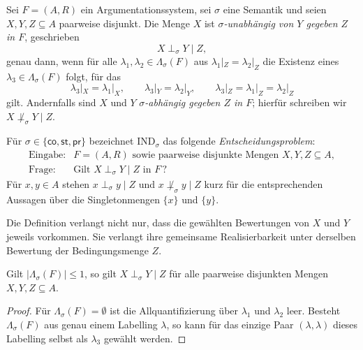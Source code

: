 \begin{Definition}
    \label{def:sigma-independence-af}
    Sei \(F=(A,R)\) ein Argumentationssystem, sei \(\sigma\) eine Semantik
    und seien \(X,Y,Z\subseteq A\) paarweise disjunkt. Die Menge \(X\) ist
    \emph{\(\sigma\)-unabhängig von \(Y\) gegeben \(Z\) in \(F\)},
    geschrieben
    \[
        X\perp_\sigma Y\mid Z,
    \]
    genau dann, wenn für alle
    \(\lambda_1,\lambda_2\in\Lambda_\sigma(F)\) aus
    \(\lambda_1|_Z=\lambda_2|_Z\) die Existenz eines
    \(\lambda_3\in\Lambda_\sigma(F)\) folgt, für das
    \[
        \lambda_3|_X=\lambda_1|_X,
        \qquad
        \lambda_3|_Y=\lambda_2|_Y,
        \qquad
        \lambda_3|_Z=\lambda_1|_Z=\lambda_2|_Z
    \]
    gilt. Andernfalls sind \(X\) und \(Y\) \emph{\(\sigma\)-abhängig
    gegeben \(Z\) in \(F\)}; hierfür schreiben wir
    \(X\not\perp_\sigma Y\mid Z\).

    Für \(\sigma\in\{\mathsf{co},\mathsf{st},\mathsf{pr}\}\) bezeichnet
    \(\mathrm{IND}_\sigma\) das folgende \emph{Entscheidungsproblem}:
    \[
        \begin{array}{ll}
        \text{Eingabe:}
            &F=(A,R)\text{ sowie paarweise disjunkte Mengen }
             X,Y,Z\subseteq A,\\
        \text{Frage:}
            &\text{Gilt }X\perp_\sigma Y\mid Z\text{ in }F\,?
        \end{array}
    \]
    Für \(x,y\in A\) stehen
    \(x\perp_\sigma y\mid Z\) und
    \(x\not\perp_\sigma y\mid Z\) kurz für die entsprechenden Aussagen
    über die Singletonmengen \(\{x\}\) und \(\{y\}\).
\end{Definition}

Die Definition verlangt nicht nur, dass die gewählten Bewertungen von \(X\)
und \(Y\) jeweils vorkommen. Sie verlangt ihre gemeinsame Realisierbarkeit
unter derselben Bewertung der Bedingungsmenge \(Z\).

\begin{Lemma}
    \label{lem:independence-trivial-labelling-set}
    Gilt \(|\Lambda_\sigma(F)|\leq 1\), so gilt
    \(X\perp_\sigma Y\mid Z\) für alle paarweise disjunkten Mengen
    \(X,Y,Z\subseteq A\).
\end{Lemma}

\begin{proof}
    Für \(\Lambda_\sigma(F)=\emptyset\) ist die Allquantifizierung über
    \(\lambda_1\) und \(\lambda_2\) leer. Besteht
    \(\Lambda_\sigma(F)\) aus genau einem Labelling \(\lambda\), so kann
    für das einzige Paar \((\lambda,\lambda)\) dieses Labelling selbst als
    \(\lambda_3\) gewählt werden.
\end{proof}

